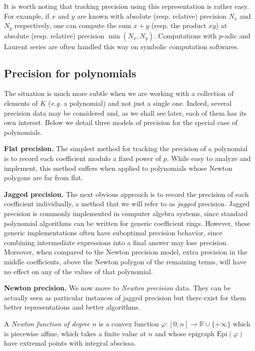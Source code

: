 \documentclass{sig-alternate-05-2015}
\newcommand{\R}{\mathbb R}
\newcommand{\Epi}{\textrm{Epi}}
\begin{document}
It is worth noting that tracking precision using this representation is 
rather easy. For example, if $x$ and $y$ are known with absolute (resp. 
relative) precision $N_x$ and $N_y$ respectively, one can compute the 
sum $x+y$ (resp. the product $xy$) at absolute (resp. relative) 
precision $\min(N_x,N_y)$. Computations with $p$-adic and Laurent
series are often handled this way on symbolic computation softwares.

\subsection{Precision for polynomials}

The situation is much more subtle when we are working with a collection 
of elements of $K$ (\emph{e.g.} a polynomial) and not just a single one.
Indeed, several precision data may be considered and, as we shall see
later, each of them has its own interest. Below we detail three models 
of precision for the special case of polynomials.

\medskip

\noindent
{\bf Flat precision.}
The simplest method for tracking the precision of a polynomial is
to record each coefficient modulo a fixed power of $p$.  While
easy to analyze and implement, this method suffers when
applied to polynomials whose Newton polygons are far from flat.

\medskip

\noindent
{\bf Jagged precision.}
The next obvious approach is to record the precision of each
coefficient individually, a method that we will refer to as \emph{jagged}
precision.  Jagged precision is commonly implemented
in computer algebra systems, since standard polynomial algorithms
can be written for generic coefficient rings.  However, these
generic implementations often have suboptimal precision behavior,
since combining intermediate expressions into a final answer
may lose precision.  Moreover, when compared to the Newton
precision model, extra precision in the middle coefficients, above
the Newton polygon of the remaining terms, will have no effect
on any of the values of that polynomial.

\medskip

\noindent
{\bf Newton precision.} 
We now move to \emph{Newton precision} data. They can be actually seen 
as particular instances of jagged precision but there exist for them 
better representations and better algorithms.

\begin{deftn}
A \emph{Newton function of degree $n$} is a convex function 
$\varphi : [0,n] \to \R \cup \{+\infty\}$ which is piecewise affine, 
which takes a finite value at $n$ and whose epigraph $\Epi(\varphi)$ 
have extremal points with integral abscissa.
\end{deftn}
\end{document}
